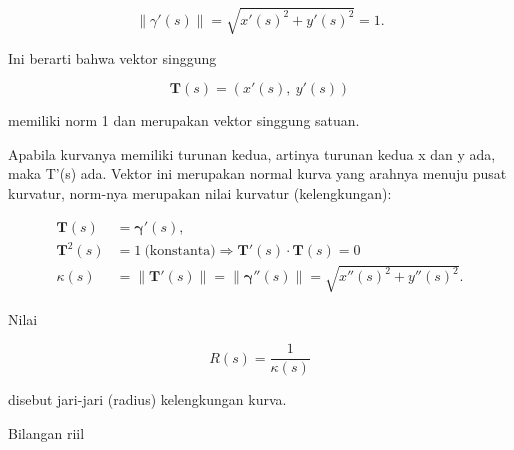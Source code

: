 \documentclass[a4paper,10pt]{article}
\begin{document}
\begin{eulernotebook}
\begin{eulercomment}
\begin{eulercomment}
\begin{eulercomment}
\begin{eulercomment}
\begin{eulercomment}
\begin{eulercomment}
\begin{eulercomment}
\begin{eulercomment}
\begin{eulercomment}
\begin{eulercomment}
\begin{eulercomment}
\begin{eulercomment}
\begin{eulercomment}
\begin{eulercomment}
\begin{eulercomment}
\begin{eulercomment}
\begin{eulercomment}
\begin{eulercomment}
\begin{eulercomment}
\begin{eulercomment}
\begin{eulercomment}
\begin{eulercomment}
\begin{eulercomment}
\end{eulercomment}
\begin{eulerformula}
\[
\|\gamma'(s)\|=\sqrt{x'(s)^2+y'(s)^2}=1.
\]
\end{eulerformula}
\begin{eulercomment}
Ini berarti bahwa vektor singgung


\end{eulercomment}
\begin{eulerformula}
\[
\mathbf{T}(s)=(x'(s),\ y'(s))
\]
\end{eulerformula}
\begin{eulercomment}
memiliki norm 1 dan merupakan vektor singgung satuan.

Apabila kurvanya memiliki turunan kedua, artinya turunan kedua x dan y
ada, maka T'(s) ada. Vektor ini merupakan normal kurva yang arahnya
menuju pusat kurvatur, norm-nya merupakan nilai kurvatur
(kelengkungan):

\end{eulercomment}
\begin{eulerformula}
\[
 \begin{aligned}\mathbf{T}(s) &= \mathbf{\gamma}'(s),\\ \mathbf{T}^{2}(s) &=1\ \text{(konstanta)}\Rightarrow \mathbf{T}'(s)\cdot \mathbf{T}(s)=0\\ \kappa(s) &=\|\mathbf {T}'(s)\|= \|\mathbf{\gamma}''(s)\|=\sqrt{x''(s)^{2}+y''(s)^{2}}.\end{aligned}
\]
\end{eulerformula}
\begin{eulercomment}
Nilai

\end{eulercomment}
\begin{eulerformula}
\[
R(s)=\frac{1}{\kappa(s)}
\]
\end{eulerformula}
\begin{eulercomment}
disebut jari-jari (radius) kelengkungan kurva.

Bilangan riil


\end{eulercomment}
\end{eulercomment}
\end{eulercomment}
\end{eulercomment}
\end{eulercomment}
\end{eulercomment}
\end{eulercomment}
\end{eulercomment}
\end{eulercomment}
\end{eulercomment}
\end{eulercomment}
\end{eulercomment}
\end{eulercomment}
\end{eulercomment}
\end{eulercomment}
\end{eulercomment}
\end{eulercomment}
\end{eulercomment}
\end{eulercomment}
\end{eulercomment}
\end{eulercomment}
\end{eulercomment}
\end{eulercomment}
\end{eulernotebook}
\end{document}
